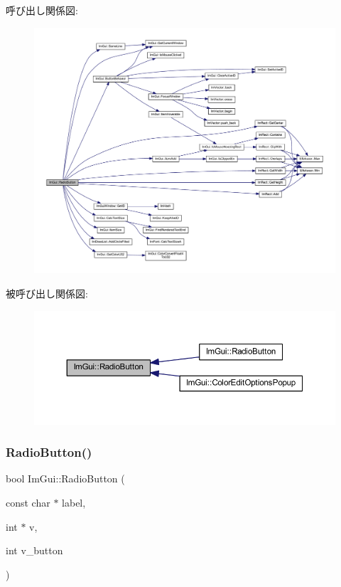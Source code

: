 呼び出し関係図\+:\nopagebreak
\begin{figure}[H]
\begin{center}
\leavevmode
\includegraphics[width=350pt]{namespace_im_gui_a6b146763845cbad5a4144772279631bc_cgraph}
\end{center}
\end{figure}
被呼び出し関係図\+:\nopagebreak
\begin{figure}[H]
\begin{center}
\leavevmode
\includegraphics[width=350pt]{namespace_im_gui_a6b146763845cbad5a4144772279631bc_icgraph}
\end{center}
\end{figure}
\mbox{\label{namespace_im_gui_a018d2b61d2f00bb7a9dd2b1f933b93a5}} 
\subsubsection{\texorpdfstring{Radio\+Button()}{RadioButton()}\hspace{0.1cm}{\footnotesize\ttfamily [2/2]}}
{\footnotesize\ttfamily bool Im\+Gui\+::\+Radio\+Button (\begin{DoxyParamCaption}\item[{const char $\ast$}]{label,  }\item[{int $\ast$}]{v,  }\item[{int}]{v\+\_\+button }\end{DoxyParamCaption})}



